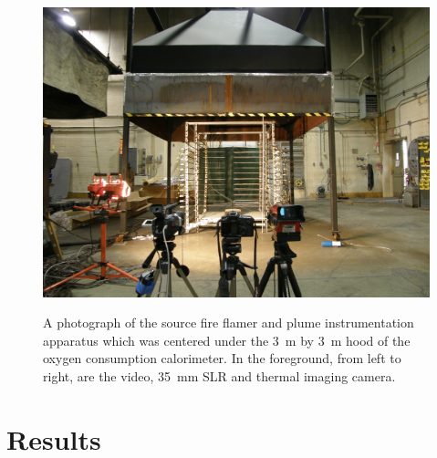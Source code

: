 \documentclass[twoside]{uocthesis}
\begin{document}
\begin{figure}
  \centering
  \includegraphics[width=\textwidth]{Source_Fire_Flamer}\\
  \caption[A photograph of the source fire flamer and plume instrumentation apparatus]{A photograph of the source fire flamer and plume instrumentation apparatus which was centered under the 3~m by 3~m hood of the oxygen consumption calorimeter.  In the foreground, from left to right, are the video, 35~mm SLR and thermal imaging camera.}
  \label{Fire_Flamer}
\end{figure}



\chapter{Results}
\end{document}
